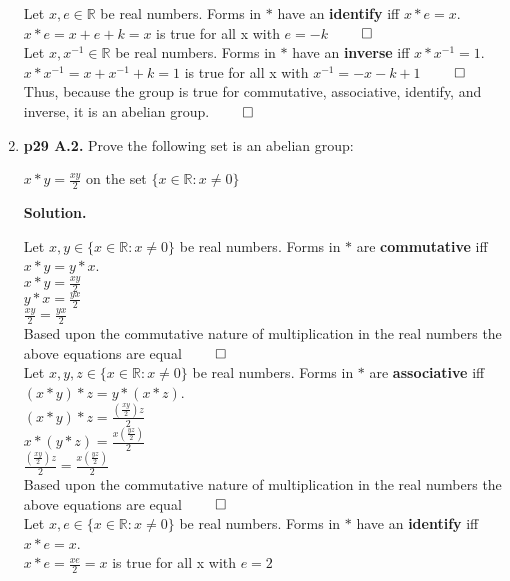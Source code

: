 \documentclass[11pt]{article}
\begin{document}
\begin{enumerate}
  Let $x,e \in \mathbb{R}$ be real numbers. Forms in $*$ have an {\bfseries identify} iff $x*e = x$. \\
  $x*e = x + e + k = x$ is true for all x with $e = -k$ $\qed$\\
  
  Let $x,x^{-1} \in \mathbb{R}$ be real numbers. Forms in $*$ have an {\bfseries inverse} iff $x*x^{-1} = 1$. \\
  $x*x^{-1} = x + x^{-1} + k = 1$ is true for all x with $x^{-1} = -x-k+1$ $\qed$\\
  
  Thus, because the group is true for commutative, associative, identify, and inverse, it is an abelian group. $\qed$\\
 
\item {\bfseries p29 A.2.}
  Prove the following set is an abelian group:
  
  $x*y = \frac{xy}{2}$ on the set $\{x \in \mathbb{R} : x \neq 0\}$
  
  {\bfseries Solution.}
  
  Let $x, y \in \{x \in \mathbb{R} : x \neq 0\}$ be real numbers. Forms in $*$ are {\bfseries commutative} iff $x*y = y*x$. \\
  $x*y = \frac{xy}{2}$ \\
  $y*x = \frac{yx}{2}$ \\
  $\frac{xy}{2} = \frac{yx}{2}$ \\
  Based upon the commutative nature of multiplication in the real numbers the above equations are equal $\qed$\\
  
  Let $x, y, z \in \{x \in \mathbb{R} : x \neq 0\}$ be real numbers. Forms in $*$ are {\bfseries associative} iff $(x*y)*z = y*(x*z)$. \\
  $(x*y)*z = \frac{(\frac{xy}{2})z}{2}$ \\
  $x*(y*z) = \frac{x(\frac{yz}{2})}{2}$ \\
  $\frac{(\frac{xy}{2})z}{2} = \frac{x(\frac{yz}{2})}{2}$ \\
  Based upon the commutative nature of multiplication in the real numbers the above equations are equal $\qed$\\
   
  Let $x,e \in \{x \in \mathbb{R} : x \neq 0\}$ be real numbers. Forms in $*$ have an {\bfseries identify} iff $x*e = x$. \\
  $x*e = \frac{xe}{2} = x$ is true for all x with $e = 2$\\
  

\end{enumerate}
\end{document}
